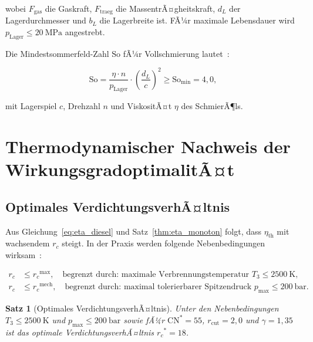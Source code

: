 ﻿\documentclass[12pt,a4paper]{article}
\newtheorem{theorem}{Satz}[section]
\newcommand{\CN}{\ensuremath{\mathrm{CN}}}
\newcommand{\etath}{\ensuremath{\eta_{\mathrm{th}}}}
\newcommand{\rc}{\ensuremath{r_c}}
\newcommand{\rcut}{\ensuremath{r_{\mathrm{cut}}}}
\begin{document}
wobei $F_{\mathrm{gas}}$ die Gaskraft, $F_{\mathrm{traeg}}$ die MassentrÃ¤gheitskraft,
$d_L$ der Lagerdurchmesser und $b_L$ die Lagerbreite ist. FÃ¼r maximale Lebensdauer
wird $p_{\mathrm{Lager}} \leq \SI{20}{\MPa}$ angestrebt.

Die Mindestsommerfeld-Zahl $\mathrm{So}$ fÃ¼r Vollschmierung lautet~\cite{DIN31651}:

\begin{equation}
  \mathrm{So} = \frac{\eta \cdot n}{p_{\mathrm{Lager}}} \cdot
  \left(\frac{d_L}{c}\right)^2 \geq \mathrm{So}_{\min} = 4{,}0,
  \label{eq:sommerfeld}
\end{equation}

mit Lagerspiel $c$, Drehzahl $n$ und ViskositÃ¤t $\eta$ des SchmierÃ¶ls.

\section{Thermodynamischer Nachweis der WirkungsgradoptimalitÃ¤t}
\label{sec:thermodynamik}

\subsection{Optimales VerdichtungsverhÃ¤ltnis}
\label{sec:thermo_rc_opt}

Aus Gleichung~\eqref{eq:eta_diesel} und Satz~\ref{thm:eta_monoton} folgt,
dass $\etath$ mit wachsendem $\rc$ steigt. In der Praxis werden folgende
Nebenbedingungen wirksam~\cite{mollenhauer2010}:

\begin{align}
  \rc &\leq \rc^{\max},\quad
  \text{begrenzt durch: maximale Verbrennungstemperatur } T_3 \leq \SI{2500}{\K}, \\
  \rc &\leq \rc^{\text{mech}},\quad
  \text{begrenzt durch: maximal tolerierbarer Spitzendruck } p_{\max} \leq \SI{200}{\bar}.
\end{align}

\begin{theorem}[Optimales VerdichtungsverhÃ¤ltnis]
\label{thm:rc_opt}
Unter den Nebenbedingungen $T_3 \leq \SI{2500}{\K}$ und
$p_{\max} \leq \SI{200}{\bar}$ sowie fÃ¼r $\CN^* = 55$,
$\rcut = 2{,}0$ und $\gamma = 1{,}35$ ist das optimale
VerdichtungsverhÃ¤ltnis $\rc^* = 18$.
\end{theorem}
\end{document}
